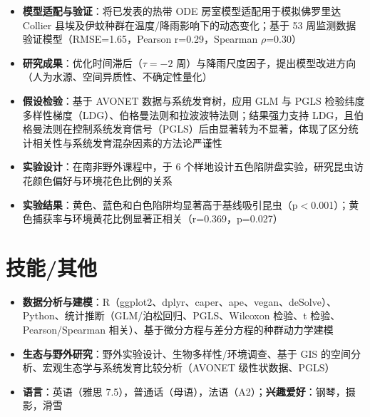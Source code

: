 \documentclass{my-resume}
\begin{document}
\begin{itemize}[parsep=0.2ex]
  \item \textbf{模型适配与验证}：将已发表的热带 ODE 房室模型适配用于模拟佛罗里达 Collier 县埃及伊蚊种群在温度/降雨影响下的动态变化；基于 53 周监测数据验证模型（RMSE=1.65，Pearson r=0.29，Spearman $\rho$=0.30）
  \item \textbf{研究成果}：优化时间滞后（$\tau=-2$ 周）与降雨尺度因子，提出模型改进方向（人为水源、空间异质性、不确定性量化）
\end{itemize}

\begin{itemize}[parsep=0.2ex]
  \item \textbf{假设检验}：基于 AVONET 数据与系统发育树，应用 GLM 与 PGLS 检验纬度多样性梯度（LDG）、伯格曼法则和拉波波特法则；结果强力支持 LDG，且伯格曼法则在控制系统发育信号（PGLS）后由显著转为不显著，体现了区分统计相关性与系统发育混杂因素的方法论严谨性
\end{itemize}

\begin{itemize}[parsep=0.2ex]
  \item \textbf{实验设计}：在南非野外课程中，于 6 个样地设计五色陷阱盘实验，研究昆虫访花颜色偏好与环境花色比例的关系
  \item \textbf{实验结果}：黄色、蓝色和白色陷阱均显著高于基线吸引昆虫（p$<$0.001）；黄色捕获率与环境黄花比例显著正相关（r=0.369，p=0.027）
\end{itemize}

\section{技能/其他}
\entrySkillsSep
\begin{itemize}[parsep=0.2ex]
  \item \textbf{数据分析与建模}：R（ggplot2、dplyr、caper、ape、vegan、deSolve）、Python、统计推断（GLM/泊松回归、PGLS、Wilcoxon 检验、t 检验、Pearson/Spearman 相关）、基于微分方程与差分方程的种群动力学建模
  \item \textbf{生态与野外研究}：野外实验设计、生物多样性/环境调查、基于 GIS 的空间分析、宏观生态学与系统发育比较分析（AVONET 级性状数据、PGLS）
  \item \textbf{语言}：英语（雅思 7.5），普通话（母语），法语（A2）；\textbf{兴趣爱好}：钢琴，摄影，滑雪
\end{itemize}
\end{document}
